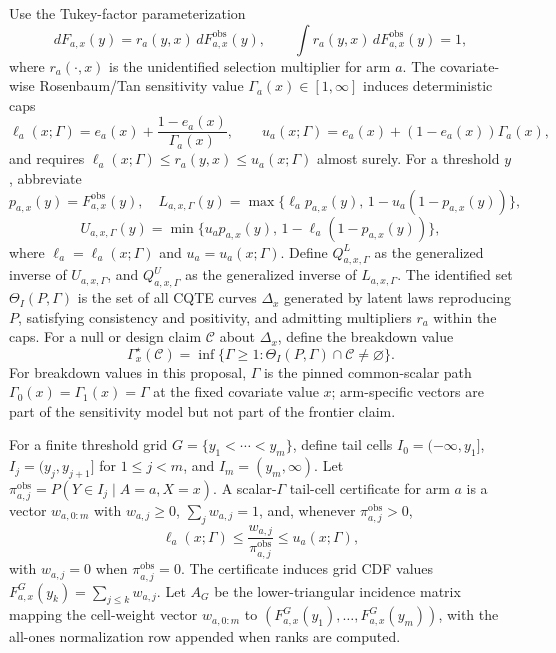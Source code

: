 \documentclass[11pt]{article}
\theoremstyle{definition}
\theoremstyle{plain}
\theoremstyle{remark}
\begin{document}
Use the Tukey-factor parameterization
\[
dF_{a,x}(y)=r_a(y,x)\,dF^{\mathrm{obs}}_{a,x}(y),
\qquad
\int r_a(y,x)\,dF^{\mathrm{obs}}_{a,x}(y)=1,
\]
where \(r_a(\cdot,x)\) is the unidentified selection multiplier for arm \(a\).  The covariate-wise Rosenbaum/Tan sensitivity value \(\Gamma_a(x)\in[1,\infty]\) induces deterministic caps
\[
\ell_a(x;\Gamma)=e_a(x)+\frac{1-e_a(x)}{\Gamma_a(x)},\qquad
u_a(x;\Gamma)=e_a(x)+(1-e_a(x))\Gamma_a(x),
\]
and requires \(\ell_a(x;\Gamma)\le r_a(y,x)\le u_a(x;\Gamma)\) almost surely.  For a threshold \(y\), abbreviate
\[
p_{a,x}(y)=F^{\mathrm{obs}}_{a,x}(y),\quad
L_{a,x,\Gamma}(y)=\max\{\ell_a p_{a,x}(y),\,1-u_a(1-p_{a,x}(y))\},
\]
\[
U_{a,x,\Gamma}(y)=\min\{u_a p_{a,x}(y),\,1-\ell_a(1-p_{a,x}(y))\},
\]
where \(\ell_a=\ell_a(x;\Gamma)\) and \(u_a=u_a(x;\Gamma)\).  Define \(Q^L_{a,x,\Gamma}\) as the generalized inverse of \(U_{a,x,\Gamma}\), and \(Q^U_{a,x,\Gamma}\) as the generalized inverse of \(L_{a,x,\Gamma}\).  The identified set \(\Theta_I(P,\Gamma)\) is the set of all CQTE curves \(\Delta_x\) generated by latent laws reproducing \(P\), satisfying consistency and positivity, and admitting multipliers \(r_a\) within the caps.  For a null or design claim \(\mathcal{C}\) about \(\Delta_x\), define the breakdown value
\[
\Gamma^\star_x(\mathcal{C})=\inf\{\Gamma\ge 1:\Theta_I(P,\Gamma)\cap\mathcal{C}\ne\varnothing\}.
\]
For breakdown values in this proposal, \(\Gamma\) is the pinned common-scalar path \(\Gamma_0(x)=\Gamma_1(x)=\Gamma\) at the fixed covariate value \(x\); arm-specific vectors are part of the sensitivity model but not part of the frontier claim.

For a finite threshold grid \(G=\{y_1<\cdots<y_m\}\), define tail cells \(I_0=(-\infty,y_1]\), \(I_j=(y_j,y_{j+1}]\) for \(1\le j<m\), and \(I_m=(y_m,\infty)\).  Let \(\pi^{\mathrm{obs}}_{a,j}=P(Y\in I_j\mid A=a,X=x)\).  A scalar-\(\Gamma\) tail-cell certificate for arm \(a\) is a vector \(w_{a,0:m}\) with \(w_{a,j}\ge0\), \(\sum_j w_{a,j}=1\), and, whenever \(\pi^{\mathrm{obs}}_{a,j}>0\),
\[
\ell_a(x;\Gamma)\le \frac{w_{a,j}}{\pi^{\mathrm{obs}}_{a,j}}\le u_a(x;\Gamma),
\]
with \(w_{a,j}=0\) when \(\pi^{\mathrm{obs}}_{a,j}=0\).  The certificate induces grid CDF values \(F^G_{a,x}(y_k)=\sum_{j\le k}w_{a,j}\).  Let \(A_G\) be the lower-triangular incidence matrix mapping the cell-weight vector \(w_{a,0:m}\) to \((F^G_{a,x}(y_1),\ldots,F^G_{a,x}(y_m))\), with the all-ones normalization row appended when ranks are computed.
\end{document}
